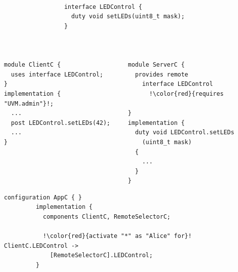 
{\small
\begin{lstlisting}[language=nesC, escapechar=!]

                 interface LEDControl {
                   duty void setLEDs(uint8_t mask);
                 }



module ClientC {                   module ServerC {
  uses interface LEDControl;         provides remote
}                                      interface LEDControl
implementation {                         !\color{red}{requires "UVM.admin"}!;
  ...                              }
  post LEDControl.setLEDs(42);     implementation {
  ...                                duty void LEDControl.setLEDs
}                                      (uint8_t mask)
                                     {
                                       ...
                                     }
                                   }
\end{lstlisting} 
}
\stopslide


{\small
\begin{lstlisting}[language=nesC, escapechar=!]
         configuration AppC { }
         implementation {
           components ClientC, RemoteSelectorC;

           !\color{red}{activate "*" as "Alice" for}! ClientC.LEDControl ->
             [RemoteSelectorC].LEDControl;
         }
\end{lstlisting}
}
\stopslide


\centerline{}
\stopslide

